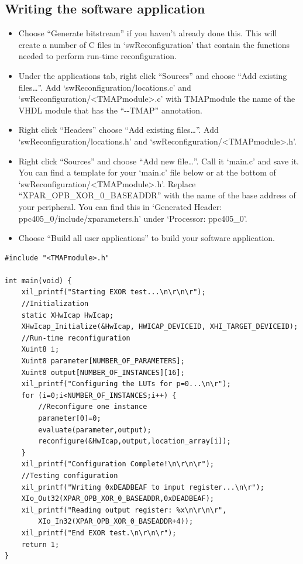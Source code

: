 \documentclass[a4paper,oneside]{memoir}
\begin{document}
\subsection{Writing the software application}\label{sec:writing_software}
\begin{itemize}
\item Choose ``Generate bitstream'' if you haven't already done this. This will create a number of C files in `swReconfiguration' that  contain the functions needed to perform run-time reconfiguration.
\item Under the applications tab, right click ``Sources'' and choose ``Add existing files\dots''. Add `swReconfiguration/locations.c' and `swReconfiguration/<TMAPmodule>.c' with TMAPmodule the name of the VHDL module that has the ``-\--TMAP'' annotation.
\item Right click ``Headers'' choose ``Add existing files\dots''. Add `swReconfiguration/locations.h' and `swReconfiguration/<TMAPmodule>.h'.
\item Right click ``Sources'' and choose ``Add new file\dots''. Call it `main.c' and save it.\\
You can find a template for your `main.c' file below or at the bottom of `swReconfiguration/<TMAPmodule>.h'. Replace ``XPAR\_OPB\_XOR\_0\_BASEADDR'' with the name of the base address of your peripheral. You can find this in `Generated Header: ppc405\_0/include/xparameters.h' under  `Processor: ppc405\_0'.
\item Choose ``Build all user applications'' to build your software application.
\end{itemize}

\lstset{language=[ansi]C,showstringspaces=false}
\begin{lstlisting}
#include "<TMAPmodule>.h"

int main(void) {
	xil_printf("Starting EXOR test...\n\r\n\r");
	//Initialization
	static XHwIcap HwIcap;
	XHwIcap_Initialize(&HwIcap, HWICAP_DEVICEID, XHI_TARGET_DEVICEID);
	//Run-time reconfiguration
	Xuint8 i;
	Xuint8 parameter[NUMBER_OF_PARAMETERS];
	Xuint8 output[NUMBER_OF_INSTANCES][16];
	xil_printf("Configuring the LUTs for p=0...\n\r");
	for (i=0;i<NUMBER_OF_INSTANCES;i++) {
		//Reconfigure one instance
		parameter[0]=0;
		evaluate(parameter,output);
		reconfigure(&HwIcap,output,location_array[i]);
	}
	xil_printf("Configuration Complete!\n\r\n\r");
	//Testing configuration
	xil_printf("Writing 0xDEADBEAF to input register...\n\r");
	XIo_Out32(XPAR_OPB_XOR_0_BASEADDR,0xDEADBEAF);
	xil_printf("Reading output register: %x\n\r\n\r", 
		XIo_In32(XPAR_OPB_XOR_0_BASEADDR+4));
	xil_printf("End EXOR test.\n\r\n\r");
	return 1;
}
\end{lstlisting}
\end{document}
